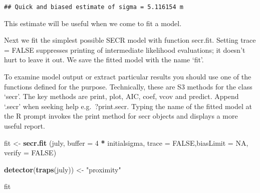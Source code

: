 \documentclass[]{article}
\newenvironment{Shaded}{\begin{snugshade}}{\end{snugshade}}
\newcommand{\DataTypeTok}[1]{\textcolor[rgb]{0.13,0.29,0.53}{#1}}
\newcommand{\DecValTok}[1]{\textcolor[rgb]{0.00,0.00,0.81}{#1}}
\newcommand{\KeywordTok}[1]{\textcolor[rgb]{0.13,0.29,0.53}{\textbf{#1}}}
\newcommand{\NormalTok}[1]{#1}
\newcommand{\OperatorTok}[1]{\textcolor[rgb]{0.81,0.36,0.00}{\textbf{#1}}}
\newcommand{\OtherTok}[1]{\textcolor[rgb]{0.56,0.35,0.01}{#1}}
\newcommand{\StringTok}[1]{\textcolor[rgb]{0.31,0.60,0.02}{#1}}
\begin{document}
\begin{verbatim}
## Quick and biased estimate of sigma = 5.116154 m
\end{verbatim}

This estimate will be useful when we come to fit a model.

Next we fit the simplest possible SECR model with function secr.fit.
Setting trace = FALSE suppresses printing of intermediate likelihood
evaluations; it doesn't hurt to leave it out. We save the fitted model
with the name `fit'.

To examine model output or extract particular results you should use one
of the functions defined for the purpose. Technically, these are S3
methods for the class `secr'. The key methods are print, plot, AIC,
coef, vcov and predict. Append `.secr' when seeking help
e.g.~?print.secr. Typing the name of the fitted model at the R prompt
invokes the print method for secr objects and displays a more useful
report.

\begin{Shaded}
\begin{Highlighting}[]
\NormalTok{fit <-}\StringTok{ }\KeywordTok{secr.fit}\NormalTok{ (july, }\DataTypeTok{buffer =} \DecValTok{4} \OperatorTok{*}\StringTok{ }\NormalTok{initialsigma, }\DataTypeTok{trace =} \OtherTok{FALSE}\NormalTok{,}\DataTypeTok{biasLimit =} \OtherTok{NA}\NormalTok{, }\DataTypeTok{verify =} \OtherTok{FALSE}\NormalTok{)}

\KeywordTok{detector}\NormalTok{(}\KeywordTok{traps}\NormalTok{(july)) <-}\StringTok{ "proximity"}

\NormalTok{fit}
\end{Highlighting}
\end{Shaded}
\end{document}
